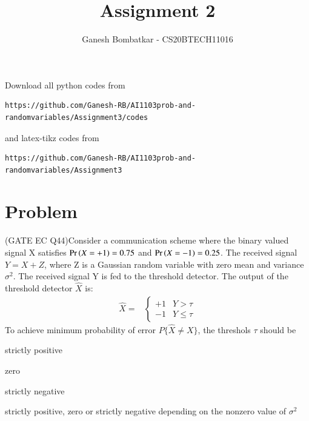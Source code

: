 \documentclass[journal,12pt,twocolumn]{IEEEtran}
\begin{document}
{\def\putbox#1#2#3{\makebox[0in][l]{\makebox[#1][l]{}\raisebox{\baselineskip}[0in][0in]{\raisebox{#2}[0in][0in]{#3}}}}
     \def\rightbox#1{\makebox[0in][r]{#1}}
     \def\centbox#1{\makebox[0in]{#1}}
     \def\topbox#1{\raisebox{-\baselineskip}[0in][0in]{#1}}
     \def\midbox#1{\raisebox{-0.5\baselineskip}[0in][0in]{#1}}
\vspace{3cm}
\title{Assignment 2}
\author{Ganesh Bombatkar - CS20BTECH11016}
\maketitle
\newpage
\bigskip
\renewcommand{\thefigure}{\theenumi}
\renewcommand{\thetable}{\theenumi}
Download all python codes from 
\begin{lstlisting}
https://github.com/Ganesh-RB/AI1103prob-and-randomvariables/Assignment3/codes
\end{lstlisting}
%
and latex-tikz codes from 
%
\begin{lstlisting}
https://github.com/Ganesh-RB/AI1103prob-and-randomvariables/Assignment3
\end{lstlisting}

\section{Problem}
(GATE EC Q44)Consider a communication scheme where the binary valued signal X satisfies $\Pr\left(X=+1\right) = 0.75$ and $\Pr\left(X=-1\right) = 0.25$. The received signal $Y = X+Z$, where Z is a Gaussian random variable with zero mean and variance $\sigma^2$. The received signal Y is fed to the threshold detector. The output of the threshold detector $\hat X$ is:
\begin{align}
\hat{X} =&
\begin{cases}
    +1 & Y> \tau \\
    -1 & Y \leqslant \tau
\end{cases}
\label{given_eqn}
 \end{align}
To achieve minimum probability of error $P\{\hat X \neq X\}$, the threshols $ \tau$ should be

\begin{enumerate}[]
\begin{multicols}{2}
\setlength\itemsep{0.1em}

\item strictly positive \label{option A}
\item zero \label{option B}
\item strictly negative \label{option C}
\item strictly positive, zero or strictly negative depending on the nonzero value of $\sigma ^2$ \label{option D}
\end{multicols}
\end{enumerate}

}
\end{document}

